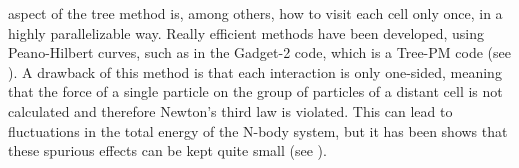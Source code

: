\begin{itemize}
aspect of the tree method is, among others, how to visit each cell
only once, in a highly parallelizable way. Really efficient methods
have been developed, using Peano-Hilbert curves, such as in the Gadget-2
code, which is a Tree-PM code (see \cite{springel_cosmological_2005}).
A drawback of this method is that each interaction is only one-sided,
meaning that the force of a single particle on the group of particles
of a distant cell is not calculated and therefore Newton's third law
is violated. This can lead to fluctuations in the total energy of
the N-body system, but it has been shows that these spurious effects
can be kept quite small (see \citet{dehnen_n-body_2011}). 
\done{}
\end{itemize}

